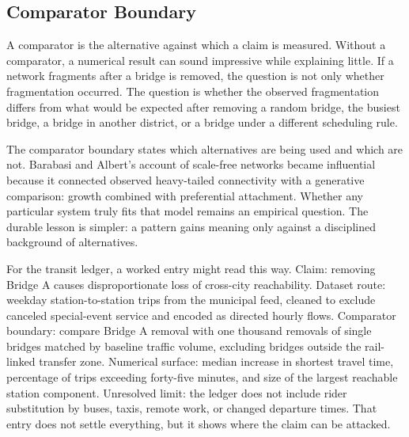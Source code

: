 \documentclass[11pt,a4paper,openany]{book}
\begin{document}
\subsection{Comparator Boundary}
A comparator is the alternative against which a claim is measured. Without a comparator, a numerical result can sound impressive while explaining little. If a network fragments after a bridge is removed, the question is not only whether fragmentation occurred. The question is whether the observed fragmentation differs from what would be expected after removing a random bridge, the busiest bridge, a bridge in another district, or a bridge under a different scheduling rule. \cite{newman_networks,barabasi_scale_free}\par
The comparator boundary states which alternatives are being used and which are not. Barabasi and Albert's account of scale-free networks became influential because it connected observed heavy-tailed connectivity with a generative comparison: growth combined with preferential attachment. Whether any particular system truly fits that model remains an empirical question. The durable lesson is simpler: a pattern gains meaning only against a disciplined background of alternatives.\par
For the transit ledger, a worked entry might read this way. Claim: removing Bridge A causes disproportionate loss of cross-city reachability. Dataset route: weekday station-to-station trips from the municipal feed, cleaned to exclude canceled special-event service and encoded as directed hourly flows. Comparator boundary: compare Bridge A removal with one thousand removals of single bridges matched by baseline traffic volume, excluding bridges outside the rail-linked transfer zone. Numerical surface: median increase in shortest travel time, percentage of trips exceeding forty-five minutes, and size of the largest reachable station component. Unresolved limit: the ledger does not include rider substitution by buses, taxis, remote work, or changed departure times. That entry does not settle everything, but it shows where the claim can be attacked.\par
\end{document}
